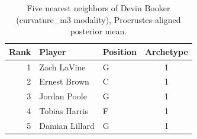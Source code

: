 \begin{table}[htbp]
  \centering\small
  \begin{tabular}{rllc}
    \toprule
    Rank & Player & Position & Archetype \\
    \midrule
    1 & Zach LaVine & G & 1 \\
    2 & Ernest Brown & C & 1 \\
    3 & Jordan Poole & G & 1 \\
    4 & Tobias Harris & F & 1 \\
    5 & Damian Lillard & G & 1 \\
    \bottomrule
  \end{tabular}
  \caption{Five nearest neighbors of Devin Booker (curvature_m3 modality), Procrustes-aligned posterior mean.}
  \label{tab:Devin_Booker_neighbors_curvature_m3}
\end{table}

